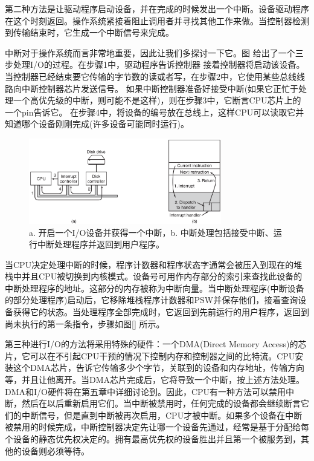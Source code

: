 	第二种方法是让驱动程序启动设备，并在完成的时候发出一个中断。设备驱动程序在这个时刻返回。操作系统紧接着阻止调用者并寻找其他工作来做。当控制器检测到传输结束时，它生成一个中断信号来完成。
	
	中断对于操作系统而言非常地重要，因此让我们多探讨一下它。图 给出了一个三步处理I/O的过程。在步骤1中，驱动程序告诉控制器
	接着控制器将启动该设备。当控制器已经结束要它传输的字节数的读或者写，在步骤2中，它使用某些总线线路向中断控制器芯片发送信号。
	如果中断控制器准备好接受中断(如果它正忙于处理一个高优先级的中断，则可能不是这样)，则在步骤3中，它断言CPU芯片上的一个pin告诉它。
	在步骤4中，将设备的编号放在总线上，这样CPU可以读取它并知道哪个设备刚刚完成(许多设备可能同时运行)。 
	
	\begin{figure}[ht]\small
	 	\centering
	 	\includegraphics[width=0.75\textwidth]{FIG/1-11.png}
	 	\caption{a. 开启一个I/O设备并获得一个中断，b. 中断处理包括接受中断、运行中断处理程序并返回到用户程序。}\label{fig:interrupt}
	\end{figure}

	当CPU决定处理中断的时候，程序计数器和程序状态字通常会被压入到现在的堆栈中并且CPU被切换到内核模式。设备号可用作内存部分的索引来查找此设备的中断处理程序的地址。这部分的内存被称为中断向量。当中断处理程序(中断设备的部分处理程序)启动后，它移除堆栈程序计数器和PSW并保存他们，接着查询设备获得它的状态。当处理程序全部完成时，它返回到先前运行的用户程序，返回到尚未执行的第一条指令，步骤如图\ref{} 所示。
	
	第三种进行I/O的方法将采用特殊的硬件：一个DMA(Direct Memory Access)的芯片，它可以在不引起CPU干预的情况下控制内存和控制器之间的比特流。CPU安装这个DMA芯片，告诉它传输多少个字节，关联到的设备和内存地址，传输方向等，并且让他离开。当DMA芯片完成后，它将导致一个中断，按上述方法处理。DMA和I/O硬件将在第五章中详细讨论到。因此，CPU有一种方法可以禁用中断，然后在以后重新启用它们。当中断被禁用时，任何完成的设备都会继续断言它们的中断信号，但是直到中断被再次启用，CPU才被中断。如果多个设备在中断被禁用的时候完成，中断控制器决定先让哪一个设备先通过，经常是基于分配给每个设备的静态优先权决定的。拥有最高优先权的设备胜出并且第一个被服务到，其他的设备则必须等待。
	
